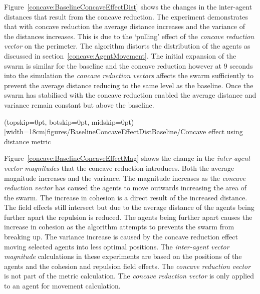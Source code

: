 \documentclass{ieeeaccess}
\begin{document}
Figure~\ref{concave:BaselineConcaveEffectDist} shows the changes in the inter-agent distances that result from the concave reduction. The experiment demonstrates that with concave reduction the average distance increases and the variance of the distances increases. This is due to the `pulling' effect of the \textit{concave reduction vector} on the perimeter. The algorithm distorts the distribution of the agents as discussed in section~\ref{concave:AgentMovement}. The initial expansion of the swarm is similar for the baseline and the concave reduction however at 9 seconds into the simulation the \textit{concave reduction vectors} affects the swarm sufficiently to prevent the average distance reducing to the same level as the baseline. Once the swarm has stabilised with the concave reduction enabled the average distance and variance remain constant but above the baseline.

\Figure[t!](topskip=0pt, botskip=0pt, midskip=0pt)[width=18cm]{figures/BaselineConcaveEffectDist}{Baseline/Concave effect using distance metric\label{concave:BaselineConcaveEffectDist}}

Figure~\ref{concave:BaselineConcaveEffectMag} shows the change in the \textit{inter-agent vector magnitudes} that the concave reduction introduces. Both the average magnitude increases and the variance. The magnitude increases as the \textit{concave reduction vector} has caused the agents to move outwards increasing the area of the swarm. The increase in cohesion is a direct result of the increased distance. The field effects still intersect but due to the average distance of the agents being further apart the repulsion is reduced. The agents being further apart causes the increase in cohesion as the algorithm attempts to prevents the swarm from breaking up. The variance increase is caused by the concave reduction effect moving selected agents into less optimal positions.
The \textit{inter-agent vector magnitude} calculations in these experiments are based on the positions of the agents and the cohesion and repulsion field effects. The \textit{concave reduction vector} is not part of the metric calculation. The \textit{concave reduction vector} is only applied to an agent for movement calculation. 
\end{document}
